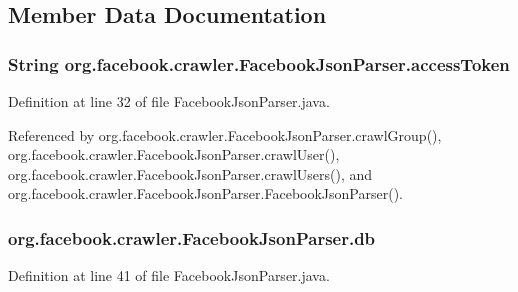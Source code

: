 \subsection{Member Data Documentation}
\hypertarget{classorg_1_1facebook_1_1crawler_1_1_facebook_json_parser_a31fa96aed58c0b5ab6a156224d88cc19}{
\subsubsection[{access\-Token}]{\setlength{\rightskip}{0pt plus 5cm}String org.\-facebook.\-crawler.\-Facebook\-Json\-Parser.\-access\-Token\hspace{0.3cm}{\ttfamily [private]}}}\label{classorg_1_1facebook_1_1crawler_1_1_facebook_json_parser_a31fa96aed58c0b5ab6a156224d88cc19}


Definition at line 32 of file Facebook\-Json\-Parser.\-java.



Referenced by org.\-facebook.\-crawler.\-Facebook\-Json\-Parser.\-crawl\-Group(), org.\-facebook.\-crawler.\-Facebook\-Json\-Parser.\-crawl\-User(), org.\-facebook.\-crawler.\-Facebook\-Json\-Parser.\-crawl\-Users(), and org.\-facebook.\-crawler.\-Facebook\-Json\-Parser.\-Facebook\-Json\-Parser().

\hypertarget{classorg_1_1facebook_1_1crawler_1_1_facebook_json_parser_a0411f79e4986d72a4274a775d54ed42e}{
\subsubsection[{db}]{ org.\-facebook.\-crawler.\-Facebook\-Json\-Parser.\-db\hspace{0.3cm}{\ttfamily [private]}}}\label{classorg_1_1facebook_1_1crawler_1_1_facebook_json_parser_a0411f79e4986d72a4274a775d54ed42e}


Definition at line 41 of file Facebook\-Json\-Parser.\-java.



